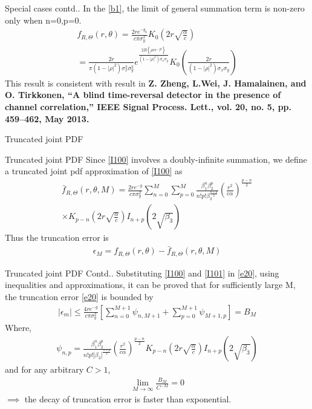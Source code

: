 \documentclass{beamer}
\providecommand{\sbrak}[1]{\ensuremath{{}\left[#1\right]}}
\providecommand{\brak}[1]{\ensuremath{\left(#1\right)}}
\providecommand{\cbrak}[1]{\ensuremath{\left\{#1\right\}}}
\begin{document}
\begin{frame}{Special cases contd..}
    In the \eqref{b1}, the limit of general summation term is non-zero only when n=0,p=0.
    \begin{multline}
        f_{R,\Theta}\brak{r,\theta}=\frac{2re^{-g_0}}{c\pi\sigma_y^2} K_{0}\brak{2r\sqrt{\frac{\alpha}{c}}}\\
        =\frac{2r}{\pi(1-|\rho|^2)\sigma_x^2\sigma_y^2}e^{\frac{2R\cbrak{\rho re^{-j\theta}}}{(1-|\rho|^2)\sigma_x\sigma_y}}K_0\brak{\frac{2r}{(1-|\rho|^2)\sigma_x\sigma_y}}
    \end{multline}
    This result is consistent with result in \textbf{Z. Zheng, L.Wei, J. Hamalainen, and O. Tirkkonen, “A blind time-reversal
detector in the presence of channel correlation,” IEEE Signal Process. Lett.,
vol. 20, no. 5, pp. 459–462, May 2013.}
\end{frame}
\begin{frame}{Truncated joint PDF}
    \begin{block}{Truncated joint PDF}
    Since \eqref{I100} involves a doubly-infinite summation, we define a truncated joint pdf approximation of \eqref{I100} as
    \begin{multline}
        \bar{f}_{R,\Theta}\brak{r,\theta,M}=\frac{2re^{-g}}{c\pi\sigma_y^2}\sum\limits_{n=0}^{M}\sum\limits_{p=0}^{M}\frac{\beta_1^n\beta_2^p}{n!p!\beta_3^{\frac{n+p}{2}}}\brak{\frac{r^2}{c\alpha}}^\frac{p-n}{2} \\\times K_{p-n}\brak{2r\sqrt{\frac{\alpha}{c}}}I_{n+p}\brak{2\sqrt{\beta_3}}\label{I101}
    \end{multline}
    Thus the truncation error is
    \begin{align}
        \epsilon_M= f_{R,\Theta}\brak{r,\theta}-\bar{f}_{R,\Theta}\brak{r,\theta,M}\label{e20}
    \end{align}
    \end{block}
\end{frame}
\begin{frame}{Truncated joint PDF Contd..}
    Substituting \eqref{I100} and \eqref{I101} in \eqref{e20}, using inequalities and approximations, it can be proved that for sufficiently large M, the truncation error \eqref{e20} is bounded by
    \begin{align}
        |\epsilon_m|\le\frac{4re^{-g}}{c\pi\sigma_y^2}\sbrak{\sum\limits_{n=0}^{M+1}\psi_{n,M+1}+\sum\limits_{p=0}^{M+1}\psi_{M+1,p}}=B_M
    \end{align}
    Where,
    \begin{align}
        \psi_{n,p}=\frac{\beta_1^n\beta_2^p}{n!p!|\beta_3|^{\frac{n+p}{2}}}\brak{\frac{r^2}{c\alpha}}^\frac{p-n}{2} K_{p-n}\brak{2r\sqrt{\frac{\alpha}{c}}}I_{n+p}\brak{2\sqrt{\beta_3}}
    \end{align}
    and for any arbitrary $C>1$,
    \begin{align}
        \lim\limits_{M\to\infty}\frac{B_M}{C^{-M}}=0
    \end{align}
    $\implies$ the decay of truncation error is faster than exponential.
\end{frame}
\end{document}
